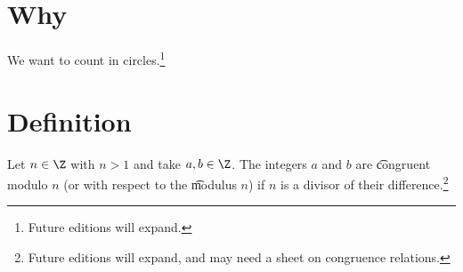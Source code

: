 

\section*{Why}

We want to count in circles.\footnote{Future editions will expand.}

\section*{Definition}

Let $n \in \Z $ with $n > 1$ and take $a, b \in \Z $.
The integers $a$ and $b$ are \t{congruent modulo} $n$ (or with respect to the \t{modulus} $n$) if $n$ is a divisor of their difference.\footnote{Future editions will expand, and may need a sheet on congruence relations.}

\blankpage